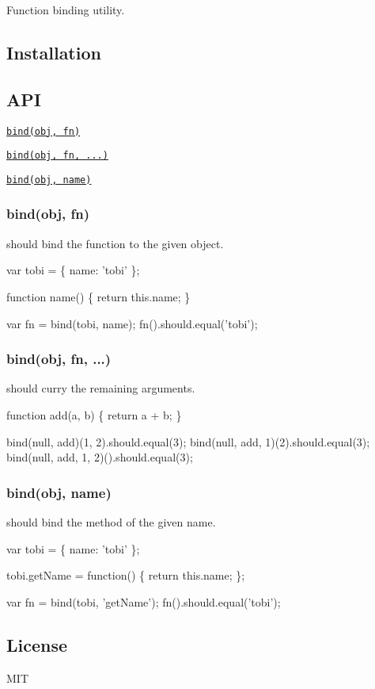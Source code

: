 Function binding utility.

\subsection*{Installation}




\subsection*{A\+PI}


\begin{DoxyItemize}
\item \href{#bindobj-fn}{\tt bind(obj, fn)}
\item \href{#bindobj-fn-}{\tt bind(obj, fn, ...)}
\item \href{#bindobj-name}{\tt bind(obj, name)} 
\end{DoxyItemize}

\label{_bindobj-fn}%
 \subsubsection*{bind(obj, fn)}

should bind the function to the given object.


\begin{DoxyCode}
var tobi = \{ name: 'tobi' \};

function name() \{
  return this.name;
\}

var fn = bind(tobi, name);
fn().should.equal('tobi');
\end{DoxyCode}


\label{_bindobj-fn-}%
 \subsubsection*{bind(obj, fn, ...)}

should curry the remaining arguments.


\begin{DoxyCode}
function add(a, b) \{
  return a + b;
\}

bind(null, add)(1, 2).should.equal(3);
bind(null, add, 1)(2).should.equal(3);
bind(null, add, 1, 2)().should.equal(3);
\end{DoxyCode}


\label{_bindobj-name}%
 \subsubsection*{bind(obj, name)}

should bind the method of the given name.


\begin{DoxyCode}
var tobi = \{ name: 'tobi' \};

tobi.getName = function() \{
  return this.name;
\};

var fn = bind(tobi, 'getName');
fn().should.equal('tobi');
\end{DoxyCode}


\subsection*{License}

M\+IT 